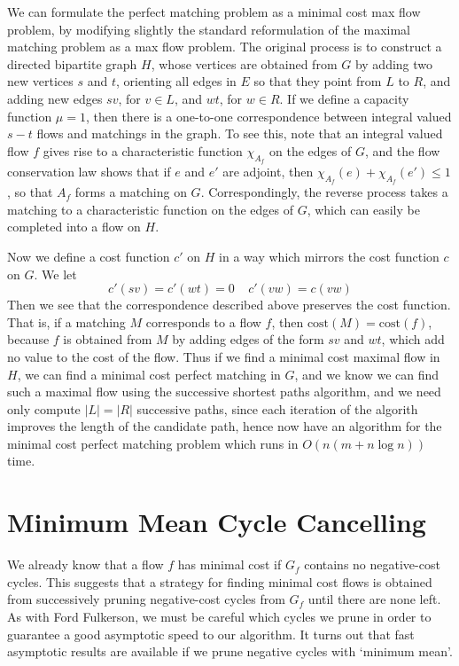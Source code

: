 We can formulate the perfect matching problem as a minimal cost max flow problem, by modifying slightly the standard reformulation of the maximal matching problem as a max flow problem. The original process is to construct a directed bipartite graph $H$, whose vertices are obtained from $G$ by adding two new vertices $s$ and $t$, orienting all edges in $E$ so that they point from $L$ to $R$, and adding new edges $sv$, for $v \in L$, and $wt$, for $w \in R$. If we define a capacity function $\mu = 1$, then there is a one-to-one correspondence between integral valued $s-t$ flows and matchings in the graph. To see this, note that an integral valued flow $f$ gives rise to a characteristic function $\chi_{A_f}$ on the edges of $G$, and the flow conservation law shows that if $e$ and $e'$ are adjoint, then $\chi_{A_f}(e) + \chi_{A_f}(e') \leq 1$, so that $A_f$ forms a matching on $G$. Correspondingly, the reverse process takes a matching to a characteristic function on the edges of $G$, which can easily be completed into a flow on $H$.

Now we define a cost function $c'$ on $H$ in a way which mirrors the cost function $c$ on $G$. We let
%
\[ c'(sv) = c'(wt) = 0\ \ \ \ \ c'(vw) = c(vw) \]
%
Then we see that the correspondence described above preserves the cost function. That is, if a matching $M$ corresponds to a flow $f$, then $\text{cost}(M) = \text{cost}(f)$, because $f$ is obtained from $M$ by adding edges of the form $sv$ and $wt$, which add no value to the cost of the flow. Thus if we find a minimal cost maximal flow in $H$, we can find a minimal cost perfect matching in $G$, and we know we can find such a maximal flow using the successive shortest paths algorithm, and we need only compute $|L| = |R|$ successive paths, since each iteration of the algorith improves the length of the candidate path, hence now have an algorithm for the minimal cost perfect matching problem which runs in $O(n(m + n \log n))$ time.

\section{Minimum Mean Cycle Cancelling}

We already know that a flow $f$ has minimal cost if $G_f$ contains no negative-cost cycles. This suggests that a strategy for finding minimal cost flows is obtained from successively pruning negative-cost cycles from $G_f$ until there are none left. As with Ford Fulkerson, we must be careful which cycles we prune in order to guarantee a good asymptotic speed to our algorithm. It turns out that fast asymptotic results are available if we prune negative cycles with `minimum mean'.

